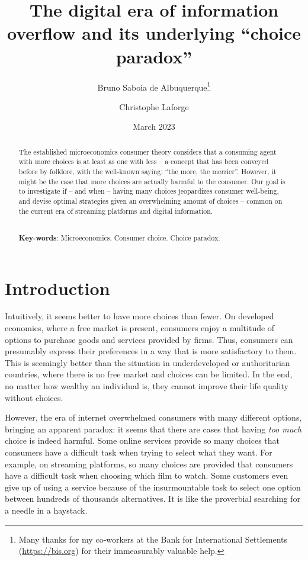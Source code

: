 \documentclass[12pt, letterpaper]{article}
\title{The digital era of information overflow and its underlying ``choice paradox''}
\author{Bruno Saboia de Albuquerque\thanks{Many thanks for my co-workers at the Bank for International Settlements (\url{https://bis.org}) for their immeasurably valuable help.}\and Christophe Laforge}
\date{March 2023}
\begin{document}
	\maketitle

	\begin{abstract}
		\noindent The established microeconomics consumer theory considers that a consuming agent with more choices  is at least as one with less -- a concept that has been conveyed before by folklore, with the well-known saying: ``the more, the merrier''. However, it might be the case that more choices are actually harmful to the consumer. Our goal is to investigate if -- and when -- having many choices jeopardizes consumer well-being, and devise optimal strategies given an overwhelming amount of choices -- common on the current era of streaming platforms and digital information.

		\noindent
		\\\textbf{Key-words}: Microeconomics. Consumer choice. Choice paradox.

	\end{abstract}
	\clearpage

	\section{Introduction}
	Intuitively, it seems better to have more choices than fewer. On developed economies, where a free market is present, consumers enjoy a multitude of options to purchase goods and services provided by firms. Thus, consumers can presumably express their preferences in a way that is more satisfactory to them. This is seemingly better than the situation in underdeveloped or authoritarian countries, where there is no free market and choices can be limited. In the end, no matter how wealthy an individual is, they cannot improve their life quality without choices.

	However, the era of internet overwhelmed consumers with many different options, bringing an apparent paradox: it seems that there are cases that having \textit{too much} choice is indeed harmful. Some online services provide so many choices that consumers have a difficult task when trying to select what they want. For example, on streaming platforms, so many choices are provided that consumers have a difficult task when choosing which film to watch. Some customers even give up of using a service because of the insurmountable task to select one option between hundreds of thousands alternatives. It is like the proverbial searching for a needle in a haystack.
\end{document}
